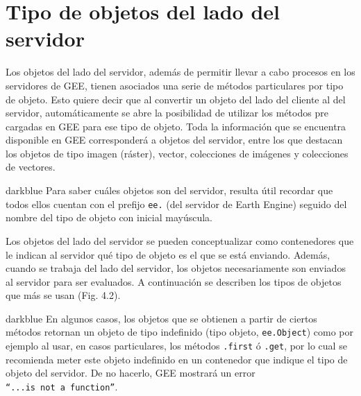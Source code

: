 \documentclass[
  12pt,
  letterpaper,
  twoside]{book}
\begin{document}
\hypertarget{tipo-de-objetos-del-lado-del-servidor}{%
\section{Tipo de objetos del lado del servidor}\label{tipo-de-objetos-del-lado-del-servidor}}

Los objetos del lado del servidor, además de permitir llevar a cabo procesos en los servidores de GEE, tienen asociados una serie de métodos particulares por tipo de objeto. Esto quiere decir que al convertir un objeto del lado del cliente al del servidor, automáticamente se abre la posibilidad de utilizar los métodos pre cargadas en GEE para ese tipo de objeto. Toda la información que se encuentra disponible en GEE corresponderá a objetos del servidor, entre los que destacan los objetos de tipo imagen (ráster), vector, colecciones de imágenes y colecciones de vectores.

\begin{bluebox2}

\begin{awesomeblock}{5pt}{\faLightbulb}{darkblue}
Para saber cuáles objetos son del servidor, resulta útil recordar que todos ellos cuentan con el prefijo \texttt{ee.} (del servidor de Earth Engine) seguido del nombre del tipo de objeto con inicial mayúscula.

\end{awesomeblock}

\end{bluebox2}

Los objetos del lado del servidor se pueden conceptualizar como contenedores que le indican al servidor qué tipo de objeto es el que se está enviando. Además, cuando se trabaja del lado del servidor, los objetos necesariamente son enviados al servidor para ser evaluados. A continuación se describen los tipos de objetos que más se usan (Fig. 4.2).

\begin{bluebox2}

\begin{awesomeblock}{5pt}{\faLightbulb}{darkblue}
En algunos casos, los objetos que se obtienen a partir de ciertos métodos retornan un objeto de tipo indefinido (tipo objeto, \texttt{ee.Object}) como por ejemplo al usar, en casos particulares, los métodos \texttt{.first} ó \texttt{.get}, por lo cual se recomienda meter este objeto indefinido en un contenedor que indique el tipo de objeto del servidor. De no hacerlo, GEE mostrará un error \texttt{“...is\ not\ a\ function”}.

\end{awesomeblock}

\end{bluebox2}
\end{document}
